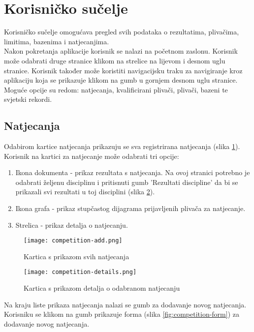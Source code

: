 \documentclass[times, utf8, zavrsni]{fer}
\begin{document}
\section{Korisničko sučelje}
Korisničko sučelje omogućava pregled svih podataka o rezultatima, plivačima, limitima, bazenima i natjecanjima. \\
Nakon pokretanja aplikacije korisnik se nalazi na početnom zaslonu. Korisnik može odabrati druge stranice klikom na strelice
na lijevom i desnom uglu stranice. Korisnik također može koristiti navigacijsku traku za navigiranje kroz aplikaciju koja se prikazuje
klikom na gumb u gornjem desnom uglu stranice. Moguće opcije su redom: natjecanja, kvalificirani plivači, plivači, bazeni te svjetski rekordi.

\subsection{Natjecanja}
Odabirom kartice natjecanja prikazuju se sva registrirana natjecanja (slika \ref{fig:competition-add}). Korisnik na kartici za natjecanje može odabrati tri opcije:
\begin{enumerate}
    \item Ikona dokumenta - prikaz rezultata s natjecanja. Na ovoj stranici potrebno je odabrati željenu disciplinu i pritisnuti gumb
    'Rezultati discipline' da bi se prikazali svi rezultati u toj disciplini (slika \ref{fig:competition-details}).
    \item Ikona grafa - prikaz stupčastog dijagrama prijavljenih plivača za natjecanje.
    \item Strelica - prikaz detalja o natjecanju.
\end{enumerate}

\begin{figure}[!h]
    \centering
    \texttt{[image: competition-add.png]}
    \centering
    \caption{Kartica s prikazom svih natjecanja}
    \label{fig:competition-add}
\end{figure}

\begin{figure}[!h]
    \centering
    \texttt{[image: competition-details.png]}
    \centering
    \caption{Kartica s prikazom detalja o odabranom natjecanju}
    \label{fig:competition-details}
\end{figure}

Na kraju liste prikaza natjecanja nalazi se gumb za dodavanje novog natjecanja. Korisniku se klikom na gumb prikazuje forma (slika \ref{fig:competition-form})
za dodavanje novog natjecanja.
\end{document}
